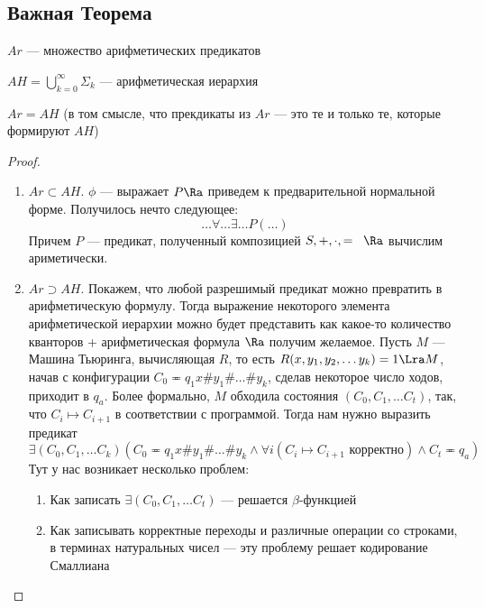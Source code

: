 
\subsection{Важная Теорема}

\begin{definition}
    \(Ar\) --- множество арифметических предикатов
\end{definition}
\begin{definition}
    \(AH = \bigcup_{k = 0}^\infty \Sigma_k\) --- арифметическая иерархия
\end{definition}

\begin{theorem}
    \(Ar = AH\) (в том смысле, что прекдикаты из \(Ar\) --- это те и только те, которые формируют \(AH\))
\end{theorem}
\begin{proof}\indent
    \begin{enumerate}
        \item[] \(Ar \subset AH\). \(\phi\) --- выражает \(P \Ra\) приведем к предварительной нормальной форме. Получилось нечто следующее:
        \[\dots \forall \dots \exists \dots P(\dots)\]
        Причем \(P\) --- предикат, полученный композицией \(S, +, \cdot, =\;\;\Ra\) вычислим ариметически.

        \item[] \(Ar \supset AH\). Покажем, что любой разрешимый предикат можно превратить в арифметическую формулу. Тогда выражение некоторого элемента арифметической иерархии можно будет представить как какое-то количество кванторов + арифметическая формула \(\Ra\) получим желаемое. Пусть \(M\) --- Машина Тьюринга, вычисляющая \(R\), то есть \(R(x, y_1, y_2, \dots y_k) = 1\Lra M\), начав с конфигурации \(C_0 \eqcirc q_1x\#y_1\#\dots\#y_k\), сделав некоторое число ходов, приходит в \(q_a\). Более формально, \(M\) обходила состояния \((C_0, C_1, \dots C_t)\), так, что \(C_i \mapsto C_{i + 1}\) в соответствии с программой. Тогда нам нужно выразить предикат 
        \[\exists(C_0, C_1, \dots C_k)(C_0 \eqcirc q_1x\#y_1\#\dots\#y_k \wedge \forall i (C_{i} \mapsto C_{i + 1} \text{ корректно}) \wedge C_t \eqcirc q_a)\]
        Тут у нас возникает несколько проблем:
        \begin{enumerate}
            \item Как записать \(\exists (C_0, C_1, \dots C_t)\) --- решается \(\beta\)-функцией
            \item Как записывать корректные переходы и различные операции со строками, в терминах натуральных чисел --- эту проблему решает кодирование Смаллиана
        \end{enumerate}
    \end{enumerate}
\end{proof}

